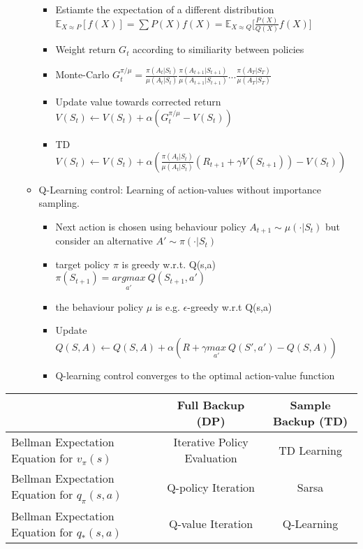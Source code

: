 \begin{itemize}
\begin{itemize}[noitemsep,nolistsep]
\begin{itemize}[noitemsep,nolistsep]
			\item Estiamte the expectation of a different distribution $\mathbb{E}_{X \approx P}[f(X)] = \sum P(X)f(X) = \mathbb{E}_{X \approx Q}\lbrack \frac{P(X)}{Q(X)}f(X)\rbrack   $
			\item Weight return $G_t$ according to similiarity between policies
			\item Monte-Carlo $G_t^{\pi / \mu} = \frac{\pi(A_t|S_t)}{\mu(A_t|S_t)} \frac{\pi(A_{t+1}|S_{t+1})}{\mu(A_{t+1}|S_{t+1})} ... \frac{\pi(A_T|S_T)}{\mu(A_T|S_T)}$
			\item Update value towards corrected return $V(S_t) \leftarrow V(S_t) + \alpha (G_t^{\pi / \mu}- V(S_t))$
			\item TD $V(S_t) \leftarrow V(S_t) + \alpha (\frac{\pi(A_t|S_t)}{\mu(A_t|S_t)}(R_{t+1} + \gamma V(S_{t+1})) - V(S_t))$
		\end{itemize}
		\item Q-Learning control: Learning of action-values without importance sampling.
		\begin{itemize}[noitemsep,nolistsep]
			\item Next action is chosen using behaviour policy $A_{t+1} \sim \mu(\cdot |S_t)$ but consider an alternative $A' \sim \pi(\cdot|S_t)$
			\item target policy $\pi$ is greedy w.r.t. Q(s,a) $\pi(S_{t+1}) = \underset{a'}{argmax}\ Q(S_{t+1}, a')$
			\item the behaviour policy $\mu$ is e.g. $\epsilon$-greedy w.r.t Q(s,a)
			\item Update $Q(S,A) \leftarrow Q(S,A) + \alpha (R + \gamma \underset{a'}{max}\ Q(S',a') - Q(S,A))$
			\item Q-learning control converges to the optimal action-value function
		\end{itemize}
	\end{itemize}
\end{itemize}
\begin{center}
	\begin{tabular}{ m{9em} |c|c } 
	  & Full Backup (DP) & Sample Backup (TD) \\ 
	 \hline
	 Bellman Expectation Equation for $v_\pi(s)$ & Iterative Policy Evaluation & TD Learning \\ 
	 \hline
	 Bellman Expectation Equation for $q_\pi(s,a)$ & Q-policy Iteration & Sarsa \\ 
	 \hline
	 Bellman Expectation Equation for $q_*(s,a)$ & Q-value Iteration & Q-Learning \\ 
	 \hline
	\end{tabular}
\end{center}

